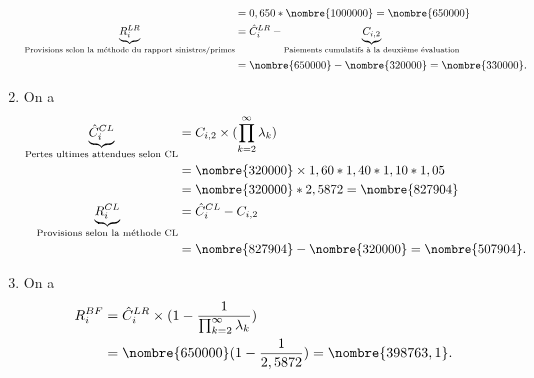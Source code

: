 \begin{exercice}
\begin{sol}
\begin{enumerate}
\begin{align*}
                                                                                 &= 0,650 * \nombre{1000000} = \nombre{650000} \\
        \underbrace{R_i^{LR}}_{\text{Provisions selon la méthode du rapport sinistres/primes}}
                                                                                 &= \hat{C}_{i}^{LR} - \underbrace{C_{i, 2}}_{\text{Paiements cumulatifs à la deuxième évaluation}} \\
                                                                                 &= \nombre{650000} - \nombre{320000} = \nombre{330000}.
      \end{align*}

    \item On a
      \begin{align*}
        \underbrace{\hat{C}_{i}^{CL}}_{\text{Pertes ultimes attendues selon CL}} &=
                                                                                   C_{i, 2} \times (\prod_{k=2}^{\infty} \lambda_k)\\
                                                                                 &= \nombre{320000} \times  1,60 * 1,40 * 1,10 * 1,05 \\
                                                                                 &= \nombre{320000} * 2,5872 = \nombre{827904}\\
        \underbrace{R_i^{CL}}_{\text{Provisions selon la méthode CL}}
                                                                                 &= \hat{C}_{i}^{CL} - C_{i, 2} \\
                                                                                 &= \nombre{827904} - \nombre{320000} = \nombre{507904}.
      \end{align*}

    \item On a
      \begin{align*}
        R_i^{BF} &= \hat{C}_{i}^{LR} \times ( 1 - \frac{1}{\prod_{k=2}^{\infty} \lambda_k}) \\
                 &= \nombre{650000} (1-\frac{1}{2,5872}) = \nombre{398763,1}.
      \end{align*}
    \end{enumerate}
  \end{sol}
\end{exercice}

